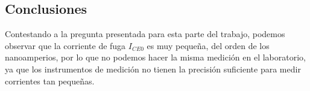 \subsection{Conclusiones}

Contestando a la pregunta presentada para esta parte del trabajo, podemos observar que la corriente de fuga $I_{CE0}$ es muy pequeña, del orden de los nanoamperios, por lo que no podemos hacer la misma medición en el laboratorio, ya que los instrumentos de medición no tienen la precisión suficiente para medir corrientes tan pequeñas. 

